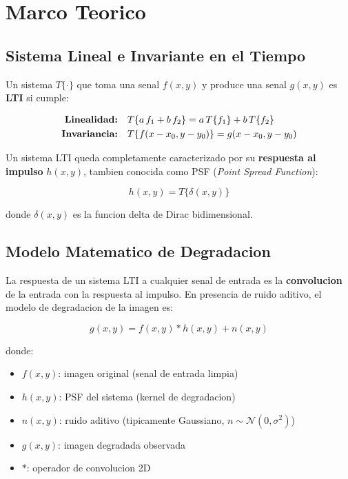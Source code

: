 \documentclass[11pt,a4paper]{article}
\begin{document}
\section{Marco Teorico}

\subsection{Sistema Lineal e Invariante en el Tiempo}

Un sistema $T\{\cdot\}$ que toma una senal $f(x,y)$ y produce una senal $g(x,y)$ es \textbf{LTI} si cumple:

\begin{align}
\text{\textbf{Linealidad:}} \quad &T\{a\,f_1 + b\,f_2\} = a\,T\{f_1\} + b\,T\{f_2\} \\
\text{\textbf{Invariancia:}} \quad &T\{f(x-x_0, y-y_0)\} = g(x-x_0, y-y_0)
\end{align}

Un sistema LTI queda completamente caracterizado por su \textbf{respuesta al impulso} $h(x,y)$, tambien conocida como PSF (\textit{Point Spread Function}):

\begin{equation}
h(x,y) = T\{\delta(x,y)\}
\end{equation}

donde $\delta(x,y)$ es la funcion delta de Dirac bidimensional.

\subsection{Modelo Matematico de Degradacion}

La respuesta de un sistema LTI a cualquier senal de entrada es la \textbf{convolucion} de la entrada con la respuesta al impulso. En presencia de ruido aditivo, el modelo de degradacion de la imagen es:

\begin{equation}
\boxed{\; g(x,y) = f(x,y) * h(x,y) + n(x,y) \;}
\end{equation}

donde:
\begin{itemize}[leftmargin=*, noitemsep]
    \item $f(x,y)$: imagen original (senal de entrada limpia)
    \item $h(x,y)$: PSF del sistema (kernel de degradacion)
    \item $n(x,y)$: ruido aditivo (tipicamente Gaussiano, $n \sim \mathcal{N}(0, \sigma^2)$)
    \item $g(x,y)$: imagen degradada observada
    \item $*$: operador de convolucion 2D
\end{itemize}
\end{document}
